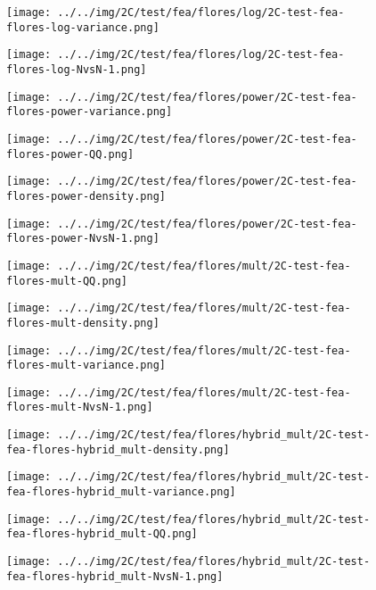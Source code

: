 \begin{figure}[H]
\centering	\texttt{[image: ../../img/2C/test/fea/flores/log/2C-test-fea-flores-log-variance.png]}
\end{figure}
\begin{figure}[H]
\centering	\texttt{[image: ../../img/2C/test/fea/flores/log/2C-test-fea-flores-log-NvsN-1.png]}
\end{figure}
\begin{figure}[H]
\centering	\texttt{[image: ../../img/2C/test/fea/flores/power/2C-test-fea-flores-power-variance.png]}
\end{figure}
\begin{figure}[H]
\centering	\texttt{[image: ../../img/2C/test/fea/flores/power/2C-test-fea-flores-power-QQ.png]}
\end{figure}
\begin{figure}[H]
\centering	\texttt{[image: ../../img/2C/test/fea/flores/power/2C-test-fea-flores-power-density.png]}
\end{figure}
\begin{figure}[H]
\centering	\texttt{[image: ../../img/2C/test/fea/flores/power/2C-test-fea-flores-power-NvsN-1.png]}
\end{figure}
\begin{figure}[H]
\centering	\texttt{[image: ../../img/2C/test/fea/flores/mult/2C-test-fea-flores-mult-QQ.png]}
\end{figure}
\begin{figure}[H]
\centering	\texttt{[image: ../../img/2C/test/fea/flores/mult/2C-test-fea-flores-mult-density.png]}
\end{figure}
\begin{figure}[H]
\centering	\texttt{[image: ../../img/2C/test/fea/flores/mult/2C-test-fea-flores-mult-variance.png]}
\end{figure}
\begin{figure}[H]
\centering	\texttt{[image: ../../img/2C/test/fea/flores/mult/2C-test-fea-flores-mult-NvsN-1.png]}
\end{figure}
\begin{figure}[H]
\centering	\texttt{[image: ../../img/2C/test/fea/flores/hybrid\_mult/2C-test-fea-flores-hybrid\_mult-density.png]}
\end{figure}
\begin{figure}[H]
\centering	\texttt{[image: ../../img/2C/test/fea/flores/hybrid\_mult/2C-test-fea-flores-hybrid\_mult-variance.png]}
\end{figure}
\begin{figure}[H]
\centering	\texttt{[image: ../../img/2C/test/fea/flores/hybrid\_mult/2C-test-fea-flores-hybrid\_mult-QQ.png]}
\end{figure}
\begin{figure}[H]
\centering	\texttt{[image: ../../img/2C/test/fea/flores/hybrid\_mult/2C-test-fea-flores-hybrid\_mult-NvsN-1.png]}
\end{figure}
